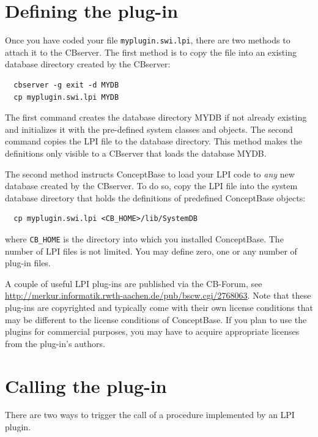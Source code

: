 \section{Defining the plug-in}
Once you have coded your file {\tt myplugin.swi.lpi},
there are two methods to attach it to the CBserver. The first method is to copy the file into an
existing database directory created by the CBserver:

\begin{verbatim}
  cbserver -g exit -d MYDB 
  cp myplugin.swi.lpi MYDB
\end{verbatim}

The first command creates the database directory MYDB if not already existing and initializes
it with the pre-defined system classes and objects. The second command copies
the LPI file to the database directory. 
This method makes the definitions only visible to a CBserver that loads the database MYDB.

The second method instructs ConceptBase to load your LPI code to {\em any\/} new database
created by the CBserver. To do so, copy the LPI file into the system database directory that
holds the definitions of predefined ConceptBase objects:

\begin{verbatim}
  cp myplugin.swi.lpi <CB_HOME>/lib/SystemDB
\end{verbatim}

where {\tt CB\_HOME} is the directory into which you installed ConceptBase.
The number of LPI files is not limited. You may define zero, one or any number
of plug-in files.

A couple of useful LPI plug-ins are published via the CB-Forum,
see \url{http://merkur.informatik.rwth-aachen.de/pub/bscw.cgi/2768063}.
Note that these plug-ins are copyrighted and typically come with their own
license conditions that may be different to the license conditions
of ConceptBase. If you plan to use the plugins for commercial purposes,
you may have to acquire appropriate licenses from the plug-in's authors.


\section{Calling the plug-in}
There are two ways to trigger the call of a procedure implemented by an LPI plugin.

